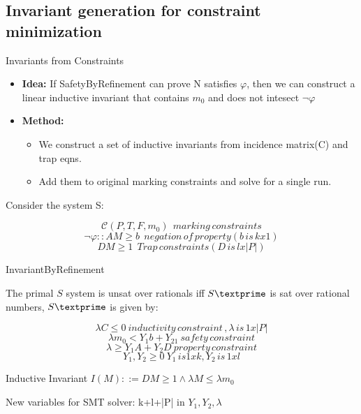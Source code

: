 \documentclass{beamer}
\begin{document}
\subsection{Invariant generation for constraint minimization}

\begin{frame}{Invariants from Constraints}
\begin{itemize}
  \item \textbf{Idea:} If SafetyByRefinement can prove N satisfies $\varphi$, then we can construct a linear inductive invariant that contains $m_0$ and
  does not intesect $\neg\varphi$
  \item \textbf{Method:} 
  \begin{itemize}
    \item We construct a set of inductive invariants from incidence matrix(C) and trap eqns.
    \item Add them to original marking constraints and solve for a single run.
  \end{itemize}
\end{itemize}
Consider the system S:

\begin{equation}
\mathcal{C}(P,T,F,m_0) \:\: marking\, constraints 
\end{equation}
\begin{equation}
\neg\varphi :: AM \geq b \:\: negation\,of\,property (b\,is\,kx1)
\end{equation}
\begin{equation}
DM \geq 1 \:\:     Trap\,constraints(D\,is\,lx|P|)
\end{equation}

\end{frame}


\begin{frame}{InvariantByRefinement}
\begin{Theorem}
  The primal $S$ system is unsat over rationals iff $S\textprime$ is sat over rational numbers, $S\textprime$ is given by:

\begin{equation}
  \lambda C \leq 0   \: inductivity\,constraint\,,\lambda\,is\,1x|P|
\end{equation}
\begin{equation}
    \lambda m_0 < Y_1b+Y_21 \: safety\,constraint
    \end{equation}
  \begin{equation}
  \lambda \geq Y_1A + Y_2D \: property\,constraint
  \end{equation}
  \begin{equation}
  Y_1,Y_2\geq 0 \: Y_1\,is1xk, Y_2\,is\,1xl
  \end{equation}
  
\end{Theorem}
\begin{block}{Inductive Invariant}
  $I(M)::= DM\geq 1 \land \lambda M \leq \lambda m_0$
\end{block}
New variables for SMT solver: k+l+|P| in $Y_1, Y_2, \lambda$
\end{frame}
\end{document}
